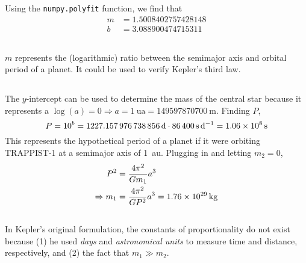 \documentclass{article}
\begin{document}
\newpage

\subsection{}


Using the \lstinline|numpy.polyfit| function, we find that
\begin{align}
    m &= \num{1.5008402757428148} \\
    b &= \num{3.088900474715311}
\end{align}

\subsection{}

\(m\) represents the (logarithmic) ratio between the semimajor axis and orbital period of a planet.
It could be used to verify Kepler's third law.

\subsection{}

The \(y\)-intercept can be used to determine the mass of the central star because it represents a \(\log(a) = 0 \Rightarrow a = \SI{1}{\astronomicalunit} = \SI{149597870700}{\meter}\).
Finding \(P\),
\begin{equation}
    P = 10^b = \SI{1227.157976738856}{\day} \cdot \SI{86400}{\second\per\day} = \SI{1.06d8}{\second}
\end{equation}
This represents the hypothetical period of a planet if it were orbiting TRAPPIST-1 at a semimajor axis of \SI{1}{\astronomicalunit}.
Plugging in and letting \(m_2 = 0\),
\begin{align}
    P^2 &= \frac{4 \pi^2}{G m_1}a^3 \\
    \Rightarrow m_1 &= \frac{4 \pi^2}{G P^2}a^3 = \SI{1.76d29}{\kilogram}
\end{align}

\subsection{}

In Kepler's original formulation, the constants of proportionality do not exist because (1) he used \emph{days} and \emph{astronomical units} to measure time and distance, respectively, and (2) the fact that \(m_1 \gg m_2\).
\end{document}
